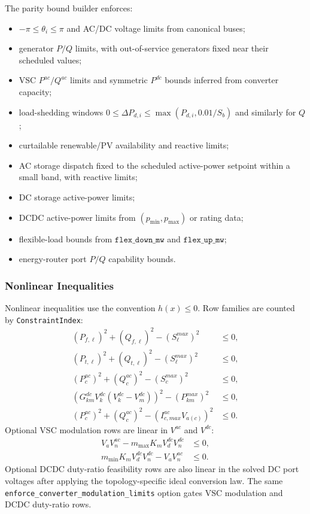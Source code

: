 The parity bound builder enforces:
\begin{itemize}
  \item \(-\pi\le\theta_i\le\pi\) and AC/DC voltage limits from canonical buses;
  \item generator \(P/Q\) limits, with out-of-service generators fixed near their
  scheduled values;
  \item VSC \(P^{ac}/Q^{ac}\) limits and symmetric \(P^{dc}\) bounds inferred
  from converter capacity;
  \item load-shedding windows
  \(0\le\Delta P_{d,i}\le\max(P_{d,i},0.01/S_b)\) and similarly for \(Q\);
  \item curtailable renewable/PV availability and reactive limits;
  \item AC storage dispatch fixed to the scheduled active-power setpoint within
  a small band, with reactive limits;
  \item DC storage active-power limits;
  \item DCDC active-power limits from \((p_{\min},p_{\max})\) or rating data;
  \item flexible-load bounds from \(\texttt{flex\_down\_mw}\) and
  \(\texttt{flex\_up\_mw}\);
  \item energy-router port \(P/Q\) capability bounds.
\end{itemize}

\subsubsection{Nonlinear Inequalities}

Nonlinear inequalities use the convention \(h(x)\le 0\).  Row families are
counted by \texttt{ConstraintIndex}:
\begin{align}
(P_{f,\ell})^2+(Q_{f,\ell})^2-(S_\ell^{max})^2&\le0,\\
(P_{t,\ell})^2+(Q_{t,\ell})^2-(S_\ell^{max})^2&\le0,\\
(P_c^{ac})^2+(Q_c^{ac})^2-(S_c^{max})^2&\le0,\\
\left(G_{km}^{dc}V_k^{dc}(V_k^{dc}-V_m^{dc})\right)^2
-(P_{km}^{max})^2&\le0,\\
(P_c^{ac})^2+(Q_c^{ac})^2
-(I_{c,max}^{ac}V_{a(c)})^2&\le0.
\end{align}
Optional VSC modulation rows are linear in \(V^{ac}\) and \(V^{dc}\):
\begin{align}
V_a V_n^{ac}-m_{\max}K_mV_d^{dc}V_n^{dc}&\le0,\\
m_{\min}K_mV_d^{dc}V_n^{dc}-V_aV_n^{ac}&\le0.
\end{align}
Optional DCDC duty-ratio feasibility rows are also linear in the solved DC port
voltages after applying the topology-specific ideal conversion law.  The same
\texttt{enforce\_converter\_modulation\_limits} option gates VSC modulation and
DCDC duty-ratio rows.

